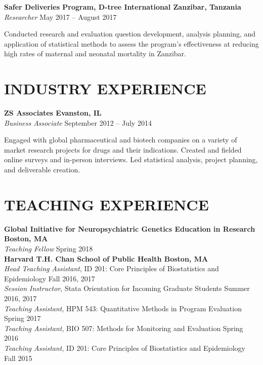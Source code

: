 \documentclass[12pt]{article}
\begin{document}
\textbf{Safer Deliveries Program, D-tree International \hfill \hfill Zanzibar, Tanzania} \\
\textit{Researcher} \hfill \hfill May 2017 -- August 2017 
\begin{addmargin}[1em]{2em} Conducted research and evaluation question development, analysis planning, and application of statistical methods to assess the program's effectiveness at reducing high rates of maternal and neonatal mortality in Zanzibar. \end{addmargin}

\section*{\textbf{{\Large I}{\small NDUSTRY} {\Large E}{\small XPERIENCE}}}
\textbf{ZS Associates \hfill \hfill Evanston, IL} \\
\textit{Business Associate} \hfill \hfill September 2012 -- July 2014
\begin{addmargin}[1em]{2em} 
	Engaged with global pharmaceutical and biotech companies on a variety of market research projects for drugs and their indications. Created and fielded online surveys and in-person interviews. Led statistical analysis, project planning, and deliverable creation.
\end{addmargin}

\section*{\textbf{{\Large T}{\small EACHING} {\Large E}{\small XPERIENCE}}}
\textbf{Global Initiative for Neuropsychiatric Genetics Education in Research \hfill \hfill Boston, MA} \\
\textit{Teaching Fellow} \hfill \hfill Spring 2018 \\

\textbf{Harvard T.H. Chan School of Public Health \hfill \hfill Boston, MA} \\
\textit{Head Teaching Assistant}, ID 201: Core Principles of Biostatistics and Epidemiology \hfill \hfill Fall 2016, 2017 \\
\textit{Session Instructor}, Stata Orientation for Incoming Graduate Students \hfill \hfill	Summer 2016, 2017 \\
\textit{Teaching Assistant}, HPM 543: Quantitative Methods in Program Evaluation \hfill \hfill Spring 2017 \\
\textit{Teaching Assistant}, BIO 507: Methods for Monitoring and Evaluation \hfill \hfill Spring 2016 \\
\textit{Teaching Assistant}, ID 201: Core Principles of Biostatistics and Epidemiology \hfill \hfill Fall 2015 \\
\end{document}
